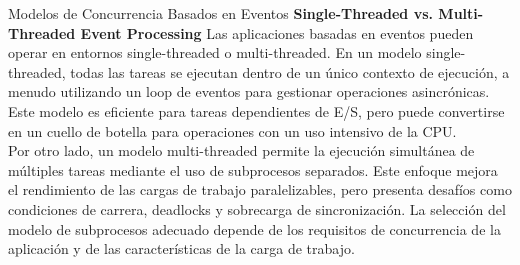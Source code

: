 \documentclass[11pt]{beamer}
\begin{document}
	\begin{frame}{Modelos de Concurrencia Basados en Eventos}
		\justifying
	\textbf{Single-Threaded vs. Multi-Threaded Event Processing} \newline
	Las aplicaciones basadas en eventos pueden operar en entornos single-threaded o multi-threaded. En un modelo single-threaded, todas las tareas se ejecutan dentro de un único contexto de ejecución, a menudo utilizando un loop de eventos para gestionar operaciones asincrónicas. Este modelo es eficiente para tareas dependientes de E/S, pero puede convertirse en un cuello de botella para operaciones con un uso intensivo de la CPU. \\
	Por otro lado, un modelo multi-threaded permite la ejecución simultánea de múltiples tareas mediante el uso de subprocesos separados. Este enfoque mejora el rendimiento de las cargas de trabajo paralelizables, pero presenta desafíos como condiciones de carrera, deadlocks y sobrecarga de sincronización. La selección del modelo de subprocesos adecuado depende de los requisitos de concurrencia de la aplicación y de las características de la carga de trabajo.	
	\end{frame}

	
\end{document}
